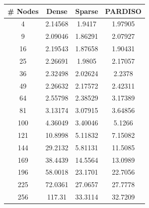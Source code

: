 \documentclass[letterpaper, 10 pt, conference]{ieeeconf}  %
\begin{document}
\begin{figure}
        \begin{minipage}[b]{.45\linewidth}
                \begin{center}
                        \begin{tabular}{|c|c|c|c|}
                        \hline
                        \textbf{\# Nodes} & \textbf{Dense} & \textbf{Sparse} & \textbf{PARDISO} \\ \hline
                        4                 & 2.14568        & 1.9417          & 1.97905          \\ \hline
                        9                 & 2.09046        & 1.86291         & 2.07927          \\ \hline
                        16                & 2.19543        & 1.87658         & 1.90431          \\ \hline
                        25                & 2.26691        & 1.9805          & 2.17057          \\ \hline
                        36                & 2.32498        & 2.02624         & 2.2378           \\ \hline
                        49                & 2.26632        & 2.17572         & 2.42311          \\ \hline
                        64                & 2.55798        & 2.38529         & 3.17389          \\ \hline
                        81                & 3.13174        & 3.07915         & 3.64856          \\ \hline
                        100               & 4.36049        & 3.40046         & 5.1266           \\ \hline
                        121               & 10.8998        & 5.11832         & 7.15082          \\ \hline
                        144               & 29.2132        & 5.81131         & 11.5085          \\ \hline
                        169               & 38.4439        & 14.5564         & 13.0989          \\ \hline
                        196               & 58.0018        & 23.1701         & 22.7056          \\ \hline
                        225               & 72.0361        & 27.0657         & 27.7778          \\ \hline
                        256               & 117.31         & 33.3114         & 32.7209          \\ \hline

\end{tabular}
\end{center}
\end{minipage}
\end{figure}
\end{document}
